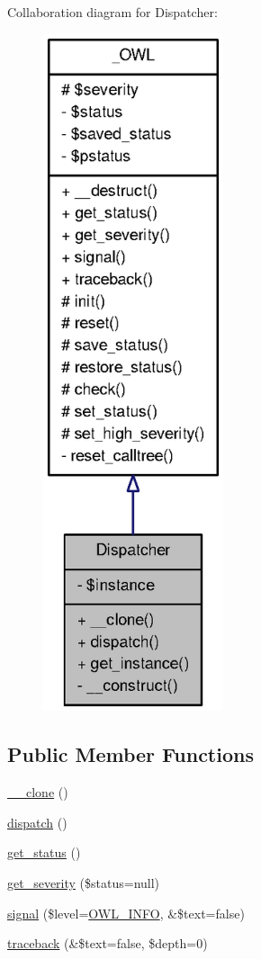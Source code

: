 Collaboration diagram for Dispatcher:\nopagebreak
\begin{figure}[H]
\begin{center}
\leavevmode
\includegraphics[width=150pt]{classDispatcher__coll__graph}
\end{center}
\end{figure}
\subsection*{Public Member Functions}
\begin{DoxyCompactItemize}
\item 
\hyperlink{classDispatcher_a601d9fd6c9a2ccbfd77b43b6f7678ba3}{\_\-\_\-clone} ()
\item 
\hyperlink{classDispatcher_af79aa0f7056d4bc6765f940a9a0fb039}{dispatch} ()
\item 
\hyperlink{class__OWL_a99ec771fa2c5c279f80152cc09e489a8}{get\_\-status} ()
\item 
\hyperlink{class__OWL_adf9509ef96858be7bdd9414c5ef129aa}{get\_\-severity} (\$status=null)
\item 
\hyperlink{class__OWL_a51ba4a16409acf2a2f61f286939091a5}{signal} (\$level=\hyperlink{owl_8severitycodes_8php_a139328861128689f2f4def6a399d9057}{OWL\_\-INFO}, \&\$text=false)
\item 
\hyperlink{class__OWL_aa29547995d6741b7d2b90c1d4ea99a13}{traceback} (\&\$text=false, \$depth=0)
\end{DoxyCompactItemize}
